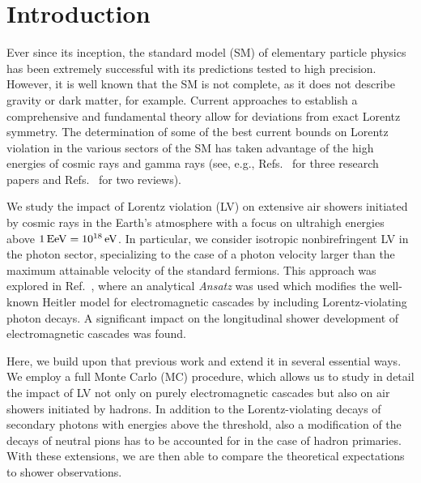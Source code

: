 \documentclass[aps,prd,preprint,longbibliography]{revtex4-1}
\begin{document}

\maketitle

\section{Introduction}

Ever since its inception, the
standard model (SM) of elementary particle physics
has been extremely successful with its predictions
tested to high precision. However, it is well known that the SM
is not complete, as it does not describe gravity or
dark matter, for example. Current approaches to
establish a comprehensive and fundamental theory
allow for deviations from exact Lorentz symmetry. The
determination of some of the best current bounds on Lorentz violation
in the various sectors of the SM has taken advantage of the
high energies of cosmic rays and gamma rays
(see, e.g., Refs.~\cite{KlinkhamerRisse2008a, KlinkhamerRisse2008b,KlinkhamerSchreck2008} for three research papers
and Refs.~\cite{JacobsonLiberatiMattingly2006,KosteleckyRussell2011}
for two reviews).


We study the impact of Lorentz violation (LV)
on extensive air showers initiated
by cosmic rays in the Earth's atmosphere with a focus on
ultrahigh energies  above $\unit[1]{EeV} = \unit[10^{18}]{eV}$.
In particular, we consider isotropic
nonbirefringent LV in the photon sector, specializing to the case of a photon velocity larger than the maximum attainable velocity of the standard fermions. This approach was explored
in Ref.~\cite{DiazKlinkhamerRisse2016}, where an analytical
\textit{Ansatz}  was used which
modifies the well-known Heitler model for electromagnetic cascades
by including Lorentz-violating photon decays. A significant impact on the longitudinal shower development of electromagnetic cascades was found.

Here, we build upon that previous
work and extend it in several essential ways.
We employ a full Monte Carlo (MC) procedure, which allows us to
study in detail the impact of LV not only on purely electromagnetic
cascades but also on air showers initiated by hadrons.
In addition to the Lorentz-violating decays of
secondary photons with energies above the threshold,
also a modification of the decays of neutral pions
has to be accounted for in the case of hadron primaries.
With these extensions, we are then able to compare the
theoretical expectations to shower observations.
\end{document}
